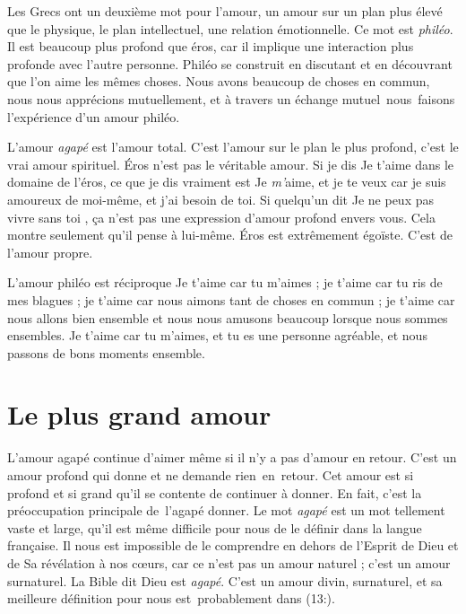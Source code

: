 Les Grecs ont un deuxième mot pour l'amour,
 un amour sur un plan plus élevé que le physique, le plan intellectuel,
 une relation émotionnelle. Ce mot est \emph{philéo}.
 Il est beaucoup plus profond que éros, car il implique une interaction
 plus profonde avec l'autre personne.
 Philéo se construit en discutant et en découvrant que l'on aime
 les mêmes choses. Nous avons beaucoup de choses en commun,
 nous nous apprécions mutuellement, et à travers un échange mutuel~nous~faisons
 l'expérience  d'un amour philéo.

L'amour \emph{agapé} est l'amour total.
 C'est l'amour sur le plan le plus profond, c'est le vrai amour spirituel.
 Éros n'est pas le véritable amour. Si je dis\frcolon{} \Og Je t'aime \Fg{}
 dans le domaine de l'éros, ce que je dis vraiment est\frcolon{}
 \Og Je \emph{m'}aime, et je te veux car je suis amoureux de moi-même,
 et j'ai besoin de toi. \Fg{}
 Si quelqu'un dit\frcolon{} \Og Je ne peux pas vivre sans toi \Fg{},
 ça n'est pas une expression d'amour profond envers vous.
 Cela montre seulement qu'il pense à lui-même.
 Éros est extrêmement égoïste. C'est de l'amour propre.

L'amour philéo est réciproque\frcolon{} \Og Je t'aime car tu m'aimes ;
 je t'aime car tu ris de mes blagues ;
 je t'aime car nous aimons tant de choses en commun ;
 je t'aime car nous allons bien ensemble et nous nous amusons beaucoup
 lorsque nous sommes ensembles. Je t'aime car tu m'aimes,
 et tu es une personne agréable, et nous passons de bons moments ensemble. \Fg{}


\section{Le plus grand amour}

L'amour agapé continue d'aimer même si il n'y a pas d'amour en retour.
 C'est un amour profond qui donne et ne demande rien~en~retour.
 Cet amour est si profond et si grand qu'il se contente
 de continuer à donner.
 En fait, c'est la préoccupation principale de~l'agapé\frcolon{} donner.
 Le mot \emph{agapé} est un mot tellement vaste et large,
 qu'il est même difficile pour nous de le définir dans la langue française.
 Il nous est impossible de le comprendre en dehors de l'Esprit de Dieu
 et de Sa révélation à nos cœurs, car ce n'est pas un amour naturel ;
 c'est un amour surnaturel.
 La Bible dit\frcolon{} \Og Dieu est \emph{agapé}. \Fg{}
 C'est un amour divin, surnaturel, et sa meilleure définition pour nous
 est~probablement dans (13:).

